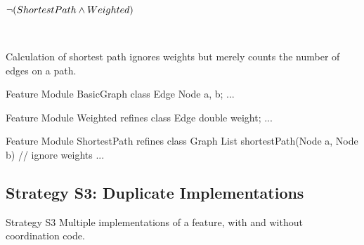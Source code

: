 \begin{frame}[fragile]{\myframetitle}
	\begin{fancycolumns}[animation=none]
		\centering

		$\neg (ShortestPath \wedge Weighted)$  

		~
		\begin{note}{}
			Calculation of shortest path ignores weights but merely counts the number of edges on a path.
		\end{note}
	\nextcolumn
\begin{codetight}{Feature Module BasicGraph}
class Edge {
	Node a, b; ...
}
\end{codetight}	
\begin{codetight}{Feature Module Weighted}
refines class Edge {
	double weight; ...
}
\end{codetight}	
\begin{codetight}{Feature Module ShortestPath}
refines class Graph {
	List shortestPath(Node a, Node b){
		// ignore weights
		... 
	}
}
\end{codetight}	
	\end{fancycolumns}
\end{frame}

\subsection{Strategy S3: Duplicate Implementations}

\begin{frame}{\myframetitle}
	\begin{fancycolumns}[widths={30},animation=none]
		\begin{definition}{Strategy S3}
			Multiple implementations of a feature, with and without coordination code.
		\end{definition}
	\nextcolumn
	\end{fancycolumns}
\end{frame}


